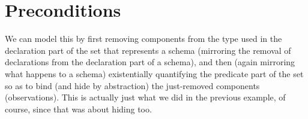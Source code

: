 \documentclass[11pt]{amsart}
\begin{document}
%
%

\section{Preconditions}

We can model this by first removing components from the type used in the declaration part of the set that represents a schema (mirroring the removal of declarations from the declaration part of a schema), and then (again mirroring what happens to a schema) existentially quantifying the predicate part of the set so as to bind (and hide by abstraction) the just-removed components (observations). This is actually just what we did in the previous example, of course, since that was about hiding too. 
\end{document}
